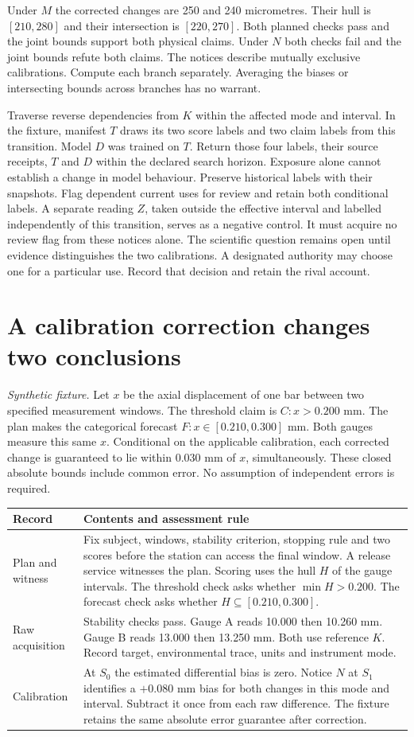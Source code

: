 \documentclass[11pt,a4paper]{article}
\newcommand{\partpage}[1]{\clearpage\section{#1}}
\begin{document}
Under $M$ the corrected changes are 250 and 240 micrometres. Their hull is $[210,280]$ and their intersection is $[220,270]$. Both planned checks pass and the joint bounds support both physical claims. Under $N$ both checks fail and the joint bounds refute both claims. The notices describe mutually exclusive calibrations. Compute each branch separately. Averaging the biases or intersecting bounds across branches has no warrant.

Traverse reverse dependencies from $K$ within the affected mode and interval. In the fixture, manifest $T$ draws its two score labels and two claim labels from this transition. Model $D$ was trained on $T$. Return those four labels, their source receipts, $T$ and $D$ within the declared search horizon. Exposure alone cannot establish a change in model behaviour. Preserve historical labels with their snapshots. Flag dependent current uses for review and retain both conditional labels. A separate reading $Z$, taken outside the effective interval and labelled independently of this transition, serves as a negative control. It must acquire no review flag from these notices alone. The scientific question remains open until evidence distinguishes the two calibrations. A designated authority may choose one for a particular use. Record that decision and retain the rival account.

\partpage{A calibration correction changes two conclusions}\label{sec:bar}
\textit{Synthetic fixture.} Let $x$ be the axial displacement of one bar between two specified measurement windows. The threshold claim is $C: x>0.200$ mm. The plan makes the categorical forecast $F: x\in[0.210,0.300]$ mm. Both gauges measure this same $x$. Conditional on the applicable calibration, each corrected change is guaranteed to lie within $0.030$ mm of $x$, simultaneously. These closed absolute bounds include common error. No assumption of independent errors is required.

\small
\begin{tabularx}{\linewidth}{@{}L{.17\linewidth}Y@{}}
\toprule
\textbf{Record} & \textbf{Contents and assessment rule} \\ \midrule
Plan and witness & Fix subject, windows, stability criterion, stopping rule and two scores before the station can access the final window. A release service witnesses the plan. Scoring uses the hull $H$ of the gauge intervals. The threshold check asks whether $\min H>0.200$. The forecast check asks whether $H\subseteq[0.210,0.300]$. \\
Raw acquisition & Stability checks pass. Gauge A reads 10.000 then 10.260 mm. Gauge B reads 13.000 then 13.250 mm. Both use reference $K$. Record target, environmental trace, units and instrument mode. \\
Calibration & At $S_0$ the estimated differential bias is zero. Notice $N$ at $S_1$ identifies a $+0.080$ mm bias for both changes in this mode and interval. Subtract it once from each raw difference. The fixture retains the same absolute error guarantee after correction. \\
\bottomrule
\end{tabularx}
\normalsize
\end{document}
